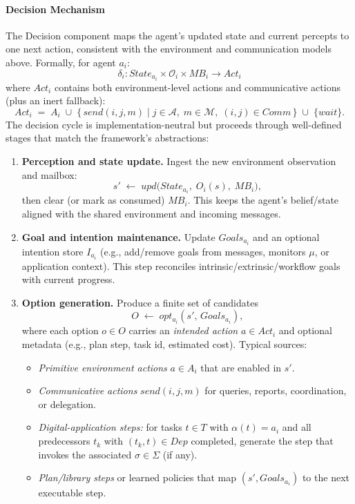 \paragraph{Decision Mechanism}
The Decision component maps the agent’s updated state and current percepts to one next action, consistent with the environment and communication models above. Formally, for agent $a_i$:
\[
\delta_i : State_{a_i} \times \mathcal{O}_i \times MB_i \rightarrow Act_i
\]
where $Act_i$ contains both environment-level actions and communicative actions (plus an inert fallback):
\[
Act_i \;=\; A_i \;\cup\; \{\,send(i,j,m)\mid j\in \mathcal{A},\; m\in\mathcal{M},\; (i,j)\in Comm\,\}\;\cup\;\{wait\}.
\]
The decision cycle is implementation-neutral but proceeds through well-defined stages that match the framework’s abstractions:

\begin{enumerate}
  \item \textbf{Perception and state update.} Ingest the new environment observation and mailbox:
  \[
  s' \;\leftarrow\; upd\bigl(State_{a_i},\; O_i(s),\; MB_i\bigr),
  \]
  then clear (or mark as consumed) $MB_i$. This keeps the agent’s belief/state aligned with the shared environment and incoming messages.

  \item \textbf{Goal and intention maintenance.} Update $Goals_{a_i}$ and an optional intention store $I_{a_i}$ (e.g., add/remove goals from messages, monitors $\mu$, or application context). This step reconciles intrinsic/extrinsic/workflow goals with current progress.

  \item \textbf{Option generation.} Produce a finite set of candidates
  \[
  O \;\leftarrow\; opt_{a_i}(s',\, Goals_{a_i}),
  \]
  where each option $o\in O$ carries an \emph{intended action} $a\in Act_i$ and optional metadata (e.g., plan step, task id, estimated cost). Typical sources:
  \begin{itemize}
    \item \emph{Primitive environment actions} $a\in A_i$ that are enabled in $s'$.
    \item \emph{Communicative actions} $send(i,j,m)$ for queries, reports, coordination, or delegation.
    \item \emph{Digital-application steps:} for tasks $t\in T$ with $\alpha(t)=a_i$ and all predecessors $t_k$ with $(t_k,t)\in Dep$ completed, generate the step that invokes the associated $\sigma\in\Sigma$ (if any).
    \item \emph{Plan/library steps} or learned policies that map $(s', Goals_{a_i})$ to the next executable step.
  \end{itemize}


\end{enumerate}
